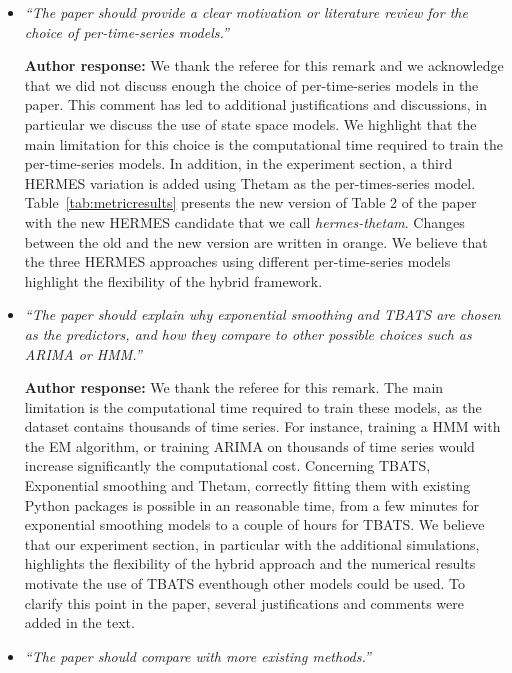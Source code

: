 \documentclass[10pt]{article} %
\begin{document}
\begin{itemize}
	
	\item {\em ``The paper should provide a clear motivation or literature review for the choice of per-time-series models.''} \medskip
	
	\textbf{Author response:} We thank the referee for this remark and we acknowledge that we did not discuss enough the choice of per-time-series models in the paper. This comment has led to additional justifications and discussions, in particular we discuss the use of state space models. We highlight that the main limitation for this choice is the computational time required to train the per-time-series models. In addition, in the experiment section, a third HERMES variation is added using Thetam as the per-times-series model. Table~\ref{tab:metricresults} presents the new version of Table 2 of the paper with the new HERMES candidate that we call \textit{hermes-thetam}. Changes between the old and the new version are written in orange. We believe that the three HERMES approaches using different per-time-series models highlight the flexibility of the hybrid framework.\\
	
	\item {\em ``The paper should explain why exponential smoothing and TBATS are chosen as the predictors, and how they compare to other possible choices such as ARIMA or HMM.''} \medskip
	
	\textbf{Author response:} We thank the referee for this remark.  The main limitation is the computational time required to train these models, as the dataset contains thousands of time series. For instance, training a HMM with the EM algorithm, or training ARIMA on thousands of time series would increase significantly the computational cost. Concerning TBATS, Exponential smoothing and Thetam, correctly fitting them with existing Python packages is possible in an reasonable time, from a few minutes for exponential smoothing models to a couple of hours for TBATS. We believe that our experiment section, in particular with the additional simulations, highlights the flexibility of the hybrid approach and the numerical results motivate the use of TBATS eventhough other models could be used. To clarify this point in the paper, several justifications and comments were added in the text.\\
	
	\item {\em ``The paper should compare with more existing methods.''} \medskip
	

\end{itemize}
\end{document}
